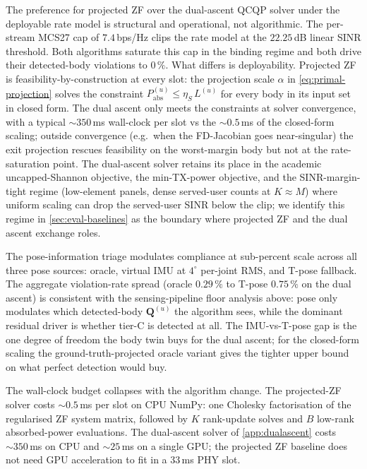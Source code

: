 \documentclass[journal,twocolumn,10pt]{IEEEtran}
\theoremstyle{plain}
\theoremstyle{remark}
\newcommand{\Pabs}{P_{\mathrm{abs}}}
\newcommand{\Qmat}{\mathbf{Q}}
\begin{document}
The preference for projected ZF over the dual-ascent QCQP solver
under the deployable rate model is structural and operational, not
algorithmic. The per-stream MCS27 cap of $7.4\,$bps/Hz clips the
rate model at the $22.25\,$dB linear SINR threshold. Both
algorithms saturate this cap in the binding regime and both drive
their detected-body violations to $0\,\%$. What differs is
deployability. Projected ZF is feasibility-by-construction at
every slot: the projection scale $\alpha$ in
\cref{eq:primal-projection} solves the constraint
$\Pabs^{(u)} \leq \eta_S\,L^{(u)}$ for every body in its input set
in closed form. The dual ascent only meets the constraints at
solver convergence, with a typical $\sim 350\,$ms wall-clock per
slot vs the $\sim 0.5\,$ms of the closed-form scaling; outside
convergence (e.g.\ when the FD-Jacobian goes near-singular) the
exit projection rescues feasibility on the worst-margin body but
not at the rate-saturation point. The dual-ascent solver retains
its place in the academic uncapped-Shannon objective, the
min-TX-power objective, and the SINR-margin-tight regime
(low-element panels, dense served-user counts at $K \approx M$)
where uniform scaling can drop the served-user SINR below the
clip; we identify this regime in \cref{sec:eval-baselines} as the
boundary where projected ZF and the dual ascent exchange roles.

The pose-information triage modulates compliance at sub-percent
scale across all three pose sources: oracle, virtual IMU at
$4^\circ$ per-joint RMS, and T-pose fallback. The aggregate
violation-rate spread (oracle $0.29\,\%$ to T-pose
$0.75\,\%$ on the dual ascent) is consistent with the
sensing-pipeline floor analysis above: pose only modulates which
detected-body $\Qmat^{(u)}$ the algorithm sees, while the
dominant residual driver is whether tier-C is detected at all.
The IMU-vs-T-pose gap is the one degree of freedom the body twin
buys for the dual ascent; for the closed-form scaling the
ground-truth-projected oracle variant gives the tighter upper
bound on what perfect detection would buy.

The wall-clock budget collapses with the algorithm change. The
projected-ZF solver costs $\sim 0.5\,$ms per slot on CPU NumPy:
one Cholesky factorisation of the regularised ZF system matrix,
followed by $K$ rank-update solves and $B$ low-rank
absorbed-power evaluations. The dual-ascent solver of
\cref{app:dualascent} costs $\sim 350\,$ms on CPU and $\sim 25\,$ms
on a single GPU; the projected ZF baseline does not need GPU
acceleration to fit in a $33\,$ms PHY slot.
\end{document}
